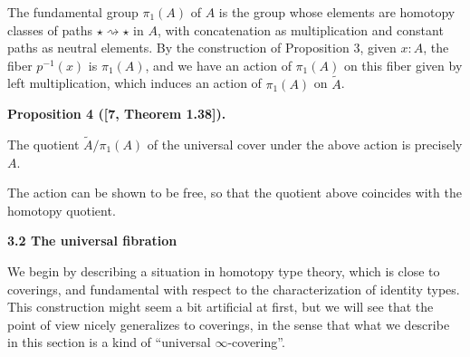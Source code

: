  
 
 
The fundamental group $\pi_{1}(A)$ of $A$ is the group whose elements are homotopy classes of paths $\star\rightsquigarrow\star$ in $A$, with concatenation as multiplication and constant paths as neutral elements. By the construction of Proposition 3, given $x:A$, the fiber $p^{-1}(x)$ is $\pi_{1}(A)$, and we have an action of $\pi_{1}(A)$ on this fiber given by left multiplication, which induces an action of $\pi_{1}(A)$ on $\tilde{A}$.\par
 
 
 
\par\medskip\noindent\textbf{Proposition 4 ([7, Theorem 1.38]).}\par
 
 
The quotient $\tilde{A}/\pi_{1}(A)$ of the universal cover under the above action is precisely $A$.\par
 
 
 
 
The action can be shown to be free, so that the quotient above coincides with the homotopy quotient.\par
 
 
 
 
\par\medskip\noindent\textbf{3.2 The universal fibration}\par
 
 
We begin by describing a situation in homotopy type theory, which is close to coverings, and fundamental with respect to the characterization of identity types. This construction might seem a bit artificial at first, but we will see that the point of view nicely generalizes to coverings, in the sense that what we describe in this section is a kind of “universal $\infty$-covering”.\par
 
 
 
